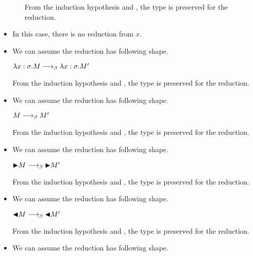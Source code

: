 \begin{itemize}
\begin{itemize}
	      	      From the induction hypothesis and \TApp, the type is preserved for the reduction.
	      \end{itemize}
	      	      	      
	      \iffullversion
	      	      	      
	\item \TVar
	      	      	      
	      In this case, there is no reduction from $x$.
	      	      	      
	\item \TAbs
	      	      	      
	      We can assume the reduction has following shape.
	      	      	      
	      $\lambda x:\sigma.M \longrightarrow_{\beta} \lambda x:\sigma.M'$
	      	      	      
	      From the induction hypothesis and \TAbs, the type is preserved for the reduction.
	      	      	      
	      	      	      
	\item \TConv
	      	      	      
	      We can assume the reduction has following shape.
	      	      	      
	      $M \longrightarrow_{\beta} M'$
	      	      	      
	      From the induction hypothesis and \TConv, the type is preserved for the reduction.
	      	      	      
	\item \TTB
	      	      	      
	      We can assume the reduction has following shape.
	      	      	      
	      ${\mathop{\blacktriangleright}} M \longrightarrow_{\beta} {\mathop{\blacktriangleright}} M'$
	      	      	      
	      From the induction hypothesis and \TTB, the type is preserved for the reduction.
	      	      	      
	\item \TTBL
	      	      	      
	      We can assume the reduction has following shape.
	      	      	      
	      ${\mathop{\blacktriangleleft}} M \longrightarrow_{\beta} {\mathop{\blacktriangleleft}} M'$
	      	      	      
	      From the induction hypothesis and \TTBL, the type is preserved for the reduction.
	      	      	      
	\item \TGen
	      	      	      
	      We can assume the reduction has following shape.
	      	      	      

\end{itemize}
